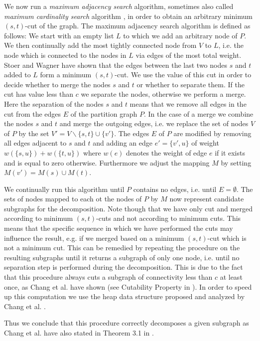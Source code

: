 \documentclass[a4paper,UKenglish,cleveref, autoref, thm-restate,authorcolumns]{lipics-v2019}
\begin{document}
We now run a \textit{maximum adjacency search} algorithm, sometimes also called \textit{maximum cardinality search} algorithm \cite{Stoer1997}, in order to obtain an arbitrary minimum $(s,t)$-cut of the graph.
The maximum adjacency search algorithm is defined as follows: We start with an empty list $L$ to which we add an arbitrary node of $P$. We then continually add the most tightly connected node from $V$ to $L$, i.e. the node which is connected to the nodes in $L$ via edges of the most total weight. Stoer and Wagner \cite{Stoer1997} have shown that the edges between the last two nodes $s$ and $t$ added to $L$ form a minimum $(s,t)$-cut.
We use the value of this cut in order to decide whether to merge the nodes $s$ and $t$ or whether to separate them. If the cut has value less than $c$ we separate the nodes, otherwise we perform a merge.
Here the separation of the nodes $s$ and $t$ means that we remove all edges in the cut from the edges $E$ of the partition graph $P$.
In the case of a merge we combine the nodes $s$ and $t$ and merge the outgoing edges, i.e. we replace the set of nodes $V$ of $P$ by the set $V'=V\backslash\{s,t\}\cup\{v'\}$. The edges $E$ of $P$ are modified by removing all edges adjacent to $s$ and $t$ and adding an edge $e'=\{v',u\}$ of weight $w(\{s,u\})+w(\{t,u\})$ where $w(e)$ denotes the weight of edge $e$ if it exists and is equal to zero otherwise.
Furthermore we adjust the mapping $M$ by setting $M(v')=M(s)\cup M(t)$.

We continually run this algorithm until $P$ contains no edges, i.e. until $E=\emptyset$. The sets of nodes mapped to each ot the nodes of $P$ by $M$ now represent candidate subgraphs for the decomposition. Note though that we have only cut and merged according to minimum $(s,t)$-cuts and not according to minimum cuts. This means that the specific sequence in which we have performed the cuts may influence the result, e.g. if we merged based on a minimum $(s,t)$-cut which is not a minimum cut.
This can be remedied by repeating the procedure on the resulting subgraphs until it returns a subgraph of only one node, i.e. until no separation step is performed during the decomposition. This is due to the fact that this procedure always cuts a subgraph of connectivity less than $c$ at least once, as Chang et al. have shown (see Cutability Property in \cite{Chang2013}).
In order to speed up this computation we use the heap data structure proposed and analyzed by Chang et al. \cite{Chang2013}.

Thus we conclude that this procedure correctly decomposes a given subgraph as Chang et al. have also stated in Theorem 3.1 in \cite{Chang2013}.
\end{document}
